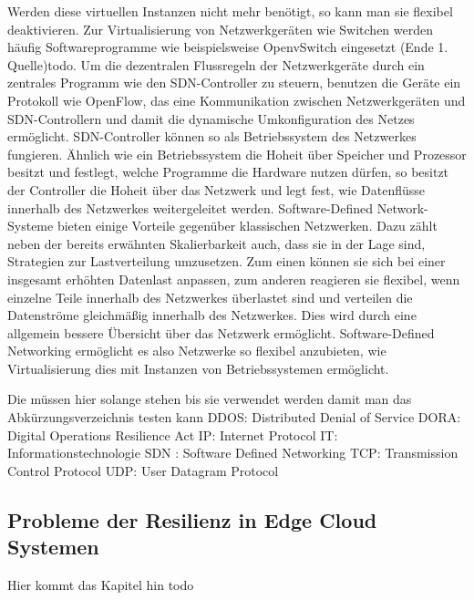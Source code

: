Werden diese virtuellen Instanzen nicht mehr benötigt, so kann man sie flexibel deaktivieren. Zur Virtualisierung von Netzwerkgeräten wie Switchen werden häufig Softwareprogramme wie beispielsweise OpenvSwitch eingesetzt (Ende 1. Quelle)todo. 
Um die dezentralen Flussregeln der Netzwerkgeräte durch ein zentrales Programm wie den SDN-Controller zu steuern, benutzen die Geräte ein Protokoll wie OpenFlow, 
das eine Kommunikation zwischen Netzwerkgeräten und SDN-Controllern und damit die dynamische Umkonfiguration des Netzes ermöglicht. SDN-Controller können so als Betriebssystem des Netzwerkes fungieren. 
Ähnlich wie ein Betriebssystem die Hoheit über Speicher und Prozessor besitzt und festlegt, welche Programme die Hardware nutzen dürfen, so besitzt der Controller die Hoheit über das Netzwerk und legt fest, 
wie Datenflüsse innerhalb des Netzwerkes weitergeleitet werden. Software-Defined Network-Systeme bieten einige Vorteile gegenüber klassischen Netzwerken. Dazu zählt neben der bereits erwähnten Skalierbarkeit auch, 
dass sie in der Lage sind, Strategien zur Lastverteilung umzusetzen. Zum einen können sie sich bei einer insgesamt erhöhten Datenlast anpassen, zum anderen reagieren sie flexibel, 
wenn einzelne Teile innerhalb des Netzwerkes überlastet sind und verteilen die Datenströme gleichmäßig innerhalb des Netzwerkes. Dies wird durch eine allgemein bessere Übersicht über das Netzwerk ermöglicht. 
Software-Defined Networking ermöglicht es also Netzwerke so flexibel anzubieten, wie Virtualisierung dies mit Instanzen von Betriebssystemen ermöglicht.





Die müssen hier solange stehen bis sie verwendet werden damit man das Abkürzungsverzeichnis testen kann
\ac{DDOS}: Distributed Denial of Service
\ac{DORA}: Digital Operations Resilience Act
\ac{IP}: Internet Protocol
\ac{IT}: Informationstechnologie
\ac{SDN} : Software Defined Networking
\ac{TCP}: Transmission Control Protocol
\ac{UDP}: User Datagram Protocol


\subsection{Probleme der Resilienz in Edge Cloud Systemen}

Hier kommt das Kapitel hin todo







